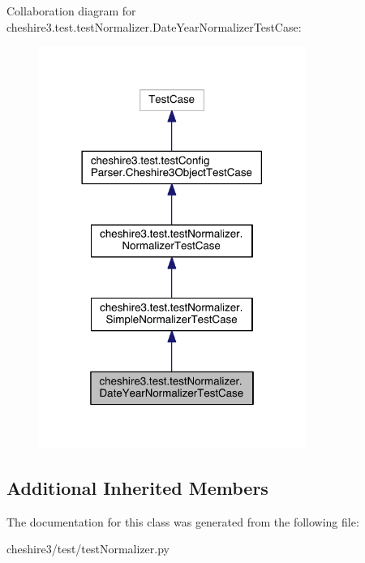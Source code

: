 Collaboration diagram for cheshire3.\-test.\-test\-Normalizer.\-Date\-Year\-Normalizer\-Test\-Case\-:
\nopagebreak
\begin{figure}[H]
\begin{center}
\leavevmode
\includegraphics[width=246pt]{classcheshire3_1_1test_1_1test_normalizer_1_1_date_year_normalizer_test_case__coll__graph}
\end{center}
\end{figure}
\subsection*{Additional Inherited Members}


The documentation for this class was generated from the following file\-:\begin{DoxyCompactItemize}
\item 
cheshire3/test/test\-Normalizer.\-py\end{DoxyCompactItemize}
